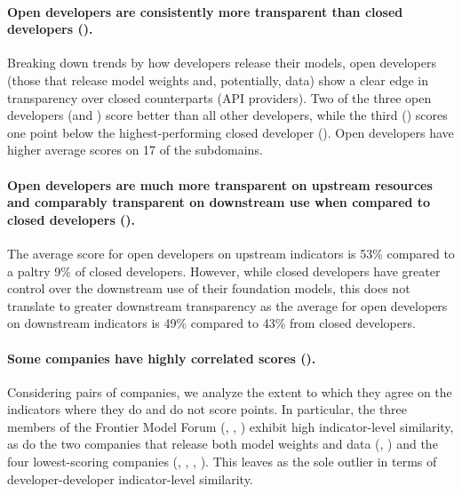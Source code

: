 \paragraph{Open developers are consistently more transparent than closed developers ().}
Breaking down trends by how developers release their models, open developers (\ie those that release model weights and, potentially, data) show a clear edge in transparency over closed counterparts (\eg API providers). 
Two of the three open developers (\meta and \huggingface) score better than all other developers, while the third (\stability) scores one point below the highest-performing closed developer (\openai). Open developers have higher average scores on 17 of the \numsubdomains subdomains. 

\paragraph{Open developers are much more transparent on upstream resources and comparably transparent on downstream use when compared to closed developers ().}
The average score for open developers on upstream indicators is 53\% compared to a paltry 9\% of closed developers.
However, while closed developers have greater control over the downstream use of their foundation models, this does not translate to greater downstream transparency as the average for open developers on downstream indicators is 49\% compared to 43\% from closed developers.

\paragraph{Some companies have highly correlated scores ().}
Considering pairs of companies, we analyze the extent to which they agree on the indicators where they do and do not score points.
In particular, the three members of the Frontier Model Forum (\anthropic, \google, \openai) exhibit high indicator-level similarity, as do the two companies that release both model weights and data (\huggingface, \stability) and the four lowest-scoring companies (\cohere, \aitwentyone, \inflection, \amazon).
This leaves \meta as the sole outlier in terms of developer-developer indicator-level similarity.
\clearpage









